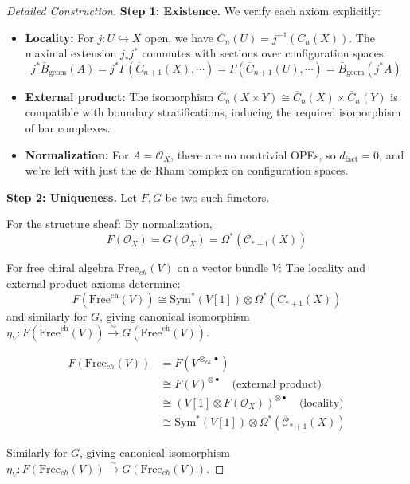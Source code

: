 \begin{proof}[Detailed Construction]
\textbf{Step 1: Existence.} We verify each axiom explicitly:
\begin{itemize}
\item \textbf{Locality:} For $j: U \hookrightarrow X$ open, we have $C_n(U) = j^{-1}(C_n(X))$. 
The maximal extension $j_*j^*$ commutes with sections over configuration spaces:
$$j^*\bar{B}_{\text{geom}}(A) = j^*\Gamma(\overline{C}_{n+1}(X), \cdots) = \Gamma(\overline{C}_{n+1}(U), \cdots) = \bar{B}_{\text{geom}}(j^*A)$$

\item \textbf{External product:} The isomorphism $\overline{C}_n(X \times Y) \cong \overline{C}_n(X) \times \overline{C}_n(Y)$ 
is compatible with boundary stratifications, inducing the required isomorphism of bar complexes.

\item \textbf{Normalization:} For $A = \mathcal{O}_X$, there are no nontrivial OPEs, so 
$d_{\text{fact}} = 0$, and we're left with just the de Rham complex on configuration spaces.
\end{itemize}

\textbf{Step 2: Uniqueness.} Let $F, G$ be two such functors. 

For the structure sheaf: By normalization, 
$$F(\mathcal{O}_X) = G(\mathcal{O}_X) = \Omega^*(\overline{\mathcal{C}}_{*+1}(X))$$

For free chiral algebra $\text{Free}_{ch}(V)$ on a vector bundle $V$:
The locality and external product axioms determine:
$$F(\text{Free}^{\text{ch}}(V)) \cong \text{Sym}^*(V[1]) \otimes \Omega^*(\overline{C}_{*+1}(X))$$
and similarly for $G$, giving canonical isomorphism $\eta_V: F(\text{Free}^{\text{ch}}(V)) \xrightarrow{\sim} G(\text{Free}^{\text{ch}}(V))$.


\begin{align}
F(\text{Free}_{ch}(V)) &= F(V^{\otimes_{ch} \bullet})\\
&\cong F(V)^{\otimes \bullet} \quad \text{(external product)}\\
&\cong (V[1] \otimes F(\mathcal{O}_X))^{\otimes \bullet} \quad \text{(locality)}\\
&\cong \text{Sym}^*(V[1]) \otimes \Omega^*(\overline{\mathcal{C}}_{*+1}(X))
\end{align}

Similarly for $G$, giving canonical isomorphism $\eta_{V}: F(\text{Free}_{ch}(V)) \xrightarrow{\sim} G(\text{Free}_{ch}(V))$.


\end{proof}
